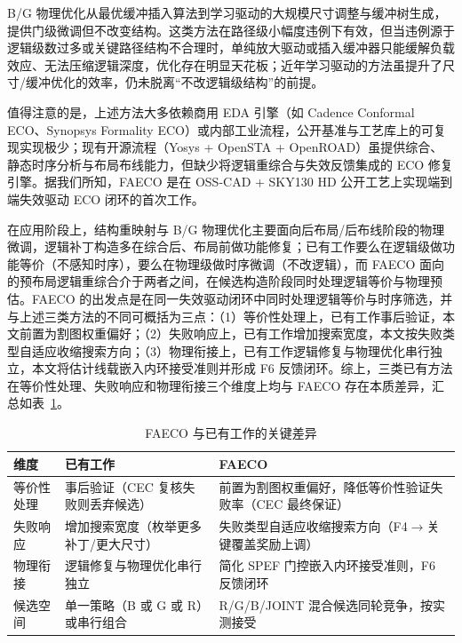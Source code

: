 \documentclass[journal]{IEEEtran}
\begin{document}
B/G 物理优化从最优缓冲插入算法\cite{liang2012buffer}到学习驱动的大规模尺寸调整与缓冲树生成\cite{liu2021rlsizer,huang2025phys,chen2024aito,zhang2025buffalo}，提供门级微调但不改变结构。这类方法在路径级小幅度违例下有效，但当违例源于逻辑级数过多或关键路径结构不合理时，单纯放大驱动或插入缓冲器只能缓解负载效应、无法压缩逻辑深度，优化存在明显天花板\cite{liu2021rlsizer,huang2025phys}；近年学习驱动的方法\cite{chen2024aito,zhang2025buffalo}虽提升了尺寸/缓冲优化的效率，仍未脱离“不改逻辑级结构”的前提。

值得注意的是，上述方法大多依赖商用 EDA 引擎（如 Cadence Conformal ECO、Synopsys Formality ECO）或内部工业流程，公开基准与工艺库上的可复现实现极少；现有开源流程（Yosys + OpenSTA + OpenROAD）虽提供综合、静态时序分析与布局布线能力，但缺少将逻辑重综合与失效反馈集成的 ECO 修复引擎。据我们所知，FAECO 是在 OSS-CAD + SKY130 HD 公开工艺上实现端到端失效驱动 ECO 闭环的首次工作。

在应用阶段上，结构重映射与 B/G 物理优化主要面向后布局/后布线阶段的物理微调，逻辑补丁构造多在综合后、布局前做功能修复；已有工作要么在逻辑级做功能等价（不感知时序），要么在物理级做时序微调（不改逻辑），而 FAECO 面向的预布局逻辑重综合介于两者之间，在候选构造阶段同时处理逻辑等价与物理预估。FAECO 的出发点是在同一失效驱动闭环中同时处理逻辑等价与时序筛选，并与上述三类方法的不同可概括为三点：（1）等价性处理上，已有工作事后验证，本文前置为割图权重偏好；（2）失败响应上，已有工作增加搜索宽度，本文按失败类型自适应收缩搜索方向；（3）物理衔接上，已有工作逻辑修复与物理优化串行独立，本文将估计线载嵌入内环接受准则并形成 F6 反馈闭环。综上，三类已有方法在等价性处理、失败响应和物理衔接三个维度上均与 FAECO 存在本质差异，汇总如表~\ref{tab:related_diff}。

\begin{table}[!t]
\centering
\caption{FAECO 与已有工作的关键差异}
\label{tab:related_diff}
\footnotesize
\setlength{\tabcolsep}{3pt}
\begin{tabular}{p{2.2cm}p{2.8cm}p{3.2cm}}
\toprule
\textbf{维度} & \textbf{已有工作} & \textbf{FAECO} \\
\midrule
等价性处理 & 事后验证（CEC 复核失败则丢弃候选） & 前置为割图权重偏好，降低等价性验证失败率（CEC 最终保证） \\
失败响应 & 增加搜索宽度（枚举更多补丁/更大尺寸） & 失败类型自适应收缩搜索方向（F4$\to$关键覆盖奖励上调） \\
物理衔接 & 逻辑修复与物理优化串行独立 & 简化 SPEF 门控嵌入内环接受准则，F6 反馈闭环 \\
候选空间 & 单一策略（B 或 G 或 R）或串行组合 & R/G/B/JOINT 混合候选同轮竞争，按实测接受 \\
\bottomrule
\end{tabular}
\end{table}
\end{document}
